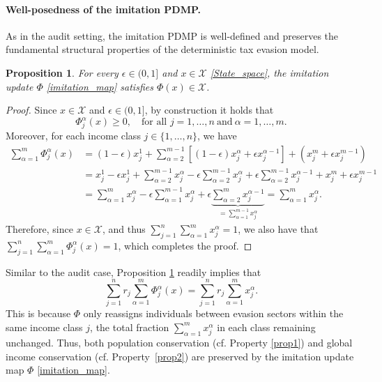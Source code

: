 \documentclass[11pt]{article}
\theoremstyle{plain}
\newtheorem{proposition}{Proposition}
\theoremstyle{definition}
\newcommand{\1}{\mathbf{1}}
\begin{document}
\paragraph{Well-posedness of the imitation PDMP.}

As in the audit setting, the imitation PDMP is well-defined and preserves the fundamental structural properties of the deterministic tax evasion model.

\begin{proposition}\label{prop:imitation}
For every $\epsilon \in (0,1]$ and $x\in \mathcal{X}$ \eqref{State_space}, the imitation update $\Phi$ \eqref{imitation_map} satisfies $\Phi(x) \in \mathcal{X}$.
\end{proposition}

\begin{proof}
Since $x \in \mathcal{X}$ and $\epsilon \in (0,1]$, by construction it holds that 
\begin{equation*}
    \Phi^\alpha_j(x) \geq 0, \quad \text{for all } j=1,\ldots,n \ \text{and} \ \alpha=1,\ldots,m.
\end{equation*}
Moreover, for each income class $j \in \{1,\ldots,n\}$, we have
\begin{align*}
\sum_{\alpha=1}^m \Phi^\alpha_j(x)
&= (1-\epsilon)x^1_j + \sum_{\alpha=2}^{m-1} \left[(1-\epsilon)x^\alpha_j + \epsilon x^{\alpha-1}_j\right] + (x^m_j + \epsilon x^{m-1}_j) \\
&=x_j^1-\epsilon x_j^1 + \sum_{\alpha=2}^{m-1} x_j^\alpha - \epsilon \sum_{\alpha=2}^{m-1}x_j^\alpha + \epsilon \sum_{\alpha=2}^{m-1} x_j^{\alpha-1}+ x_j^m +\epsilon x_j^{m-1} \\
&= \sum_{\alpha=1}^m x^\alpha_j - \epsilon \sum_{\alpha=1}^{m-1} x^\alpha_j + \epsilon \underbrace{\sum_{\alpha=2}^{m} x^{\alpha-1}_j}_{=\sum\limits_{\alpha=1}^{m-1} x^{\alpha}_j} 
= \sum_{\alpha=1}^m x^\alpha_j.
\end{align*}
Therefore, since $x\in \mathcal{X}$, and thus $\sum_{j=1}^n\sum_{\alpha=1}^m x_j^\alpha=1$, we also have that $\sum_{j=1}^n\sum_{\alpha=1}^m \Phi_j^\alpha(x)=1$, which completes the proof.
\end{proof}

Similar to the audit case, Proposition \ref{prop:imitation} readily implies that \begin{equation*}
\sum_{j=1}^n r_j \sum_{\alpha=1}^m \Phi_j^\alpha(x) = \sum_{j=1}^n r_j \sum_{\alpha=1}^m x_j^\alpha.
\end{equation*}
This is because $\Phi$ only reassigns individuals between evasion sectors within the same income class $j$, the total fraction $\sum_{\alpha=1}^m x^\alpha_j$ in each class remaining unchanged. Thus, both population conservation (cf. Property \ref{prop1}) and global income conservation (cf. Property~\ref{prop2}) are preserved by the imitation update map $\Phi$ \eqref{imitation_map}.
\end{document}
